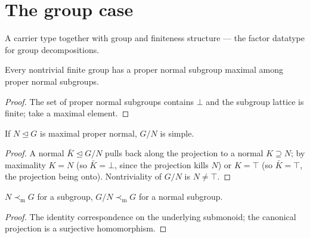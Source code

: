 \chapter{The group case}\label{ch:groupcase}

\begin{definition}\label{def:bundledfingroup}
  \leanok
  A carrier type together with group and finiteness structure --- the
  factor datatype for group decompositions.
\end{definition}

\begin{lemma}\label{lem:max-normal}
  \leanok
  Every nontrivial finite group has a proper normal subgroup maximal
  among proper normal subgroups.
\end{lemma}
\begin{proof}
  \leanok
  The set of proper normal subgroups contains $\bot$ and the subgroup
  lattice is finite; take a maximal element.
\end{proof}

\begin{lemma}\label{lem:simple-quotient}
  \leanok
  If $N \trianglelefteq G$ is maximal proper normal, $G/N$ is simple.
\end{lemma}
\begin{proof}
  \leanok
  A normal $\bar K \trianglelefteq G/N$ pulls back along the projection
  to a normal $K \supseteq N$; by maximality $K = N$ (so
  $\bar K = \bot$, since the projection kills $N$) or $K = \top$ (so
  $\bar K = \top$, the projection being onto). Nontriviality of $G/N$
  is $N \neq \top$.
\end{proof}

\begin{lemma}\label{lem:subgroup-mdiv}
  \leanok
  $N \prec_{\mathrm m} G$ for a subgroup, $G/N \prec_{\mathrm m} G$ for a normal subgroup.
\end{lemma}
\begin{proof}
  \leanok
  The identity correspondence on the underlying submonoid; the
  canonical projection is a surjective homomorphism.
\end{proof}

